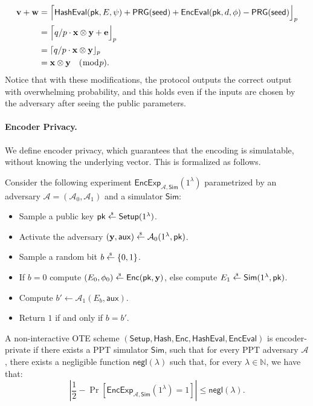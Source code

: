 \documentclass{theoretics}
\newcommand{\getsr}{\overset{\raisebox{-1pt}{$\scriptscriptstyle \$$}}{\gets}}
\newcommand{\sample}{\getsr}
\newcommand{\N}{\mathbb{N}}
\newcommand{\negl}{\mathsf{negl}}
\renewcommand{\sec}{\ensuremath{\lambda}}
\newcommand{\aux}{\mathsf{aux}}
\newcommand{\Sim}{\mathsf{Sim}}
\newcommand{\Adv}{\mathcal{A}}
\newcommand{\algofont}[1]{\ensuremath{\mathsf{#1}}}
\newcommand{\Enc}{{\algofont{Enc}}}
\newcommand{\Setup}{{\algofont{Setup}}}
\newcommand{\Eval}{\algofont{Eval}\xspace}
\newcommand{\Hash}{{\algofont{Hash}}}
\newcommand{\pk}{{\mathsf{pk}}}
\newcommand\bbbone{1}
\begin{document}
{\begin{align*}
\mathbf{v}+\mathbf{w}&=\Bigl\lceil\Hash\Eval(\pk, E, \psi)+\mathsf{PRG}(\mathsf{seed})+\Enc\Eval(\pk, d, \phi)-\mathsf{PRG}(\mathsf{seed})\Bigr\rfloor_p\\
&=\Bigl\lceil q/p \cdot \mathbf{x} \otimes \mathbf{y}+\mathbf{e}\Bigr\rfloor_p\\
&= \lceil q/p \cdot \mathbf{x} \otimes \mathbf{y}\rfloor_p\\
&=  \mathbf{x} \otimes \mathbf{y} \quad(\bmod p).
\end{align*}
Notice that with these modifications, the protocol outputs the correct output with overwhelming probability, and this holds even if the inputs are chosen by the adversary after seeing the public parameters.}

\paragraph{Encoder Privacy.} We define encoder privacy, which guarantees that the encoding is simulatable, without knowing the underlying vector. This is formalized as follows.

\begin{definition}
Consider the following experiment $\mathsf{EncExp}_{\mathcal{A}, \Sim}(\bbbone^\sec)$ parametrized by an adversary $\mathcal{A} = (\mathcal{A}_0, \allowbreak \mathcal{A}_1)$ and a simulator $\Sim$:
\begin{itemize}
    \item Sample a public key $\pk\sample\Setup(\bbbone^\sec)$.
    \item Activate the adversary $(\mathbf{y}, \aux)\sample\Adv_0(\bbbone^\sec, \pk)$.
    \item Sample a random bit $b\sample\{0, 1\}$. 
    \item If $b = 0$ compute $(E_0, \phi_0)\sample\Enc(\pk, \mathbf{y})$, else compute 
    $E_1\sample\Sim(\bbbone^\sec, \pk)$.
    \item Compute $b' \gets \Adv_1(E_b, \aux)$.
    \item Return $1$ if and only if $b =b'$.
\end{itemize}
A non-interactive OTE scheme $(\Setup, \allowbreak \Hash, \allowbreak \Enc, \allowbreak \Hash\Eval, \allowbreak \Enc\Eval)$ is encoder-private if there exists a PPT simulator $\Sim$, such that for every PPT adversary $\mathcal{A}$, there exists a negligible function $\negl(\sec)$ such that, for every $\sec\in\N$, we have that:
\[
\left|\frac{1}{2} - \Pr\left[\mathsf{EncExp}_{\mathcal{A}, \Sim}(\bbbone^\sec) = 1\right] \right|\le\negl(\sec).
\]
\end{definition}
\end{document}

